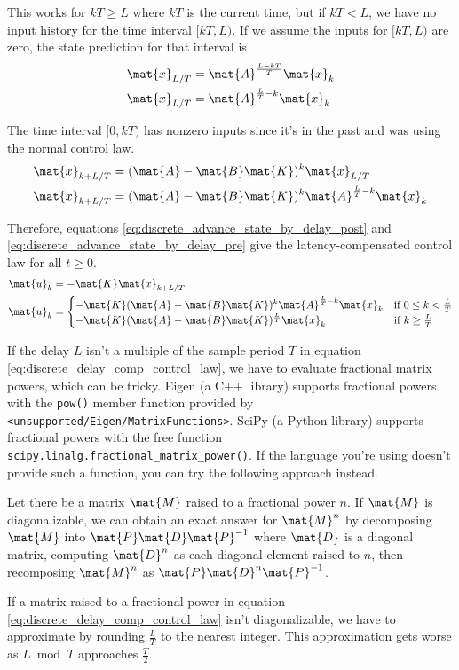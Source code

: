 This works for $kT \geq L$ where $kT$ is the current time, but if $kT < L$, we
have no input history for the time interval $[kT, L)$. If we assume the inputs
for $[kT, L)$ are zero, the state prediction for that interval is
\begin{align*}
  \mat{x}_{L/T} &= \mat{A}^\frac{L - kT}{T} \mat{x}_k \\
  \mat{x}_{L/T} &= \mat{A}^{\frac{L}{T} - k} \mat{x}_k
\end{align*}

The time interval $[0, kT)$ has nonzero inputs since it's in the past and was
using the normal control law.
\begin{align}
  \mat{x}_{k + L/T} &= (\mat{A} - \mat{B}\mat{K})^k \mat{x}_{L/T} \nonumber \\
  \mat{x}_{k + L/T} &= (\mat{A} - \mat{B}\mat{K})^k
    \mat{A}^{\frac{L}{T} - k} \mat{x}_k
    \label{eq:discrete_advance_state_by_delay_pre}
\end{align}

Therefore, equations \eqref{eq:discrete_advance_state_by_delay_post} and
\eqref{eq:discrete_advance_state_by_delay_pre} give the latency-compensated
control law for all $t \geq 0$.
\begin{align}
  \mat{u}_k &= -\mat{K} \mat{x}_{k + L/T} \nonumber \\
  \mat{u}_k &=
  \begin{cases}
    -\mat{K} (\mat{A} - \mat{B}\mat{K})^k \mat{A}^{\frac{L}{T} - k} \mat{x}_k &
      \text{if } 0 \leq k < \frac{L}{T} \\
    -\mat{K} (\mat{A} - \mat{B}\mat{K})^\frac{L}{T} \mat{x}_k &
      \text{if } k \geq \frac{L}{T}
  \end{cases}
  \label{eq:discrete_delay_comp_control_law}
\end{align}

If the delay $L$ isn't a multiple of the sample period $T$ in equation
\eqref{eq:discrete_delay_comp_control_law}, we have to evaluate fractional
matrix powers, which can be tricky. Eigen (a C++ library) supports fractional
powers with the \texttt{pow()} member function provided by
\texttt{<unsupported/Eigen/MatrixFunctions>}. SciPy (a Python library) supports
fractional powers with the free function
\texttt{scipy.linalg.fractional\_matrix\_power()}. If the language you're using
doesn't provide such a function, you can try the following approach instead.

Let there be a matrix $\mat{M}$ raised to a fractional power $n$. If $\mat{M}$
is diagonalizable, we can obtain an exact answer for $\mat{M}^n$ by decomposing
$\mat{M}$ into $\mat{P}\mat{D}\mat{P}^{-1}$ where $\mat{D}$ is a diagonal
matrix, computing $\mat{D}^n$ as each diagonal element raised to $n$, then
recomposing $\mat{M}^n$ as $\mat{P}\mat{D}^n\mat{P}^{-1}$.

If a matrix raised to a fractional power in equation
\eqref{eq:discrete_delay_comp_control_law} isn't diagonalizable, we have to
approximate by rounding $\frac{L}{T}$ to the nearest integer. This approximation
gets worse as $L \bmod T$ approaches $\frac{T}{2}$.
